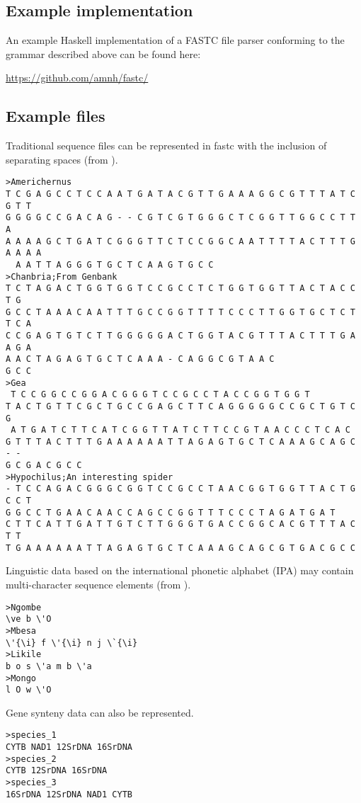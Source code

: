 \documentclass[12pt]{article}
\begin{document}
\subsection{Example implementation}

An example Haskell implementation of a FASTC file parser conforming to the grammar described above can be found here:

\url{https://github.com/amnh/fastc/}


\subsection{Example files}
Traditional sequence files can be represented in fastc with the inclusion of separating spaces (from \citealp{Wheeler1998c}).
\singlespace
\begin{verbatim}
>Americhernus      
T C G A G C C T C C A A T G A T A C G T T G A A A G G C G T T T A T C G T T 
G G G G C C G A C A G - - C G T C G T G G G C T C G G T T G G C C T T A 
A A A A G C T G A T C G G G T T C T C C G G C A A T T T T A C T T T G A A A A
  A A T T A G G G T G C T C A A G T G C C 
>Chanbria;From Genbank
T C T A G A C T G G T G G T C C G C C T C T G G T G G T T A C T A C C T G 
G C C T A A A C A A T T T G C C G G T T T T C C C T T G G T G C T C T T C A 
C C G A G T G T C T T G G G G G A C T G G T A C G T T T A C T T T G A A G A 
A A C T A G A G T G C T C A A A - C A G G C G T A A C
G C C 
>Gea
 T C C G G C C G G A C G G G T C C G C C T A C C G G T G G T 
T A C T G T T C G C T G C C G A G C T T C A G G G G G C C G C T G T C G 
 A T G A T C T T C A T C G G T T A T C T T C C G T A A C C C T C A C 
G T T T A C T T T G A A A A A A T T A G A G T G C T C A A A G C A G C - -
G C G A C G C C 
>Hypochilus;An interesting spider
- T C C A G A C G G G C G G T C C G C C T A A C G G T G G T T A C T G C C T 
G G C C T G A A C A A C C A G C C G G T T T C C C T A G A T G A T 
C T T C A T T G A T T G T C T T G G G T G A C C G G C A C G T T T A C T T
T G A A A A A A T T A G A G T G C T C A A A G C A G C G T G A C G C C 
 \end{verbatim}
 \doublespace
Linguistic data based on the international phonetic alphabet (IPA) may contain multi-character sequence elements
(from \citealp{Whiteleyetal2019}).
\singlespace
\begin{verbatim}
>Ngombe
\ve b \'O
>Mbesa
\'{\i} f \'{\i} n j \`{\i}
>Likile
b o s \'a m b \'a
>Mongo
l O w \'O
\end{verbatim}

Gene synteny data can also be represented.
\begin{verbatim}
>species_1
CYTB NAD1 12SrDNA 16SrDNA
>species_2
CYTB 12SrDNA 16SrDNA
>species_3
16SrDNA 12SrDNA NAD1 CYTB
\end{verbatim}
\end{document}

